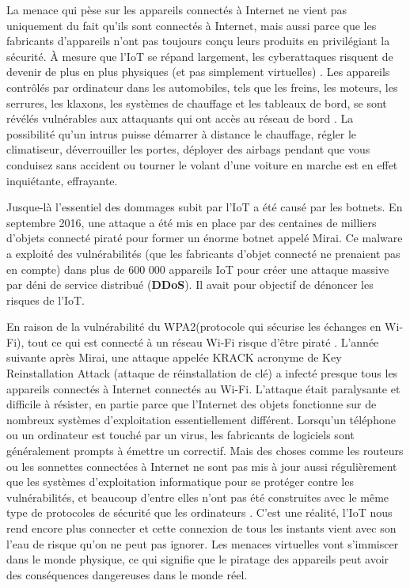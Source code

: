 La menace qui pèse sur les appareils connectés à Internet ne vient pas uniquement du fait qu’ils sont connectés à Internet, mais aussi parce que les fabricants d’appareils n’ont pas toujours conçu leurs produits en privilégiant la sécurité. À mesure que l'IoT se répand largement, les cyberattaques risquent de devenir de plus en plus physiques (et pas simplement virtuelles) \cite{clearfield2013rethinkingsiot}. Les appareils contrôlés par ordinateur dans les automobiles, tels que les freins, les moteurs, les serrures, les klaxons, les systèmes de chauf{\kern0pt}fage et les tableaux de bord, se sont révélés vulnérables aux attaquants qui ont accès au réseau de bord \cite{andy2013hackers,boyle2010proof}. La possibilité qu'un intrus puisse démarrer à distance le chauf{\kern0pt}fage, régler le climatiseur, déverrouiller les portes, déployer des airbags pendant que vous conduisez sans accident ou tourner le volant d'une voiture en marche est en ef{\kern0pt}fet inquiétante, ef{\kern0pt}frayante.


Jusque-là l’essentiel des dommages subit par l’IoT a été causé par les botnets. En septembre 2016, une attaque a été mis en place par des centaines de milliers d’objets connecté piraté pour former un énorme botnet appelé Mirai. Ce malware a exploité des vulnérabilités (que les fabricants d’objet connecté ne prenaient pas en compte) dans plus de 600 000 appareils IoT pour créer une attaque massive par déni de service distribué (\textbf{DDoS}). Il avait pour objectif de dénoncer les risques de l’IoT.


En raison de la vulnérabilité du WPA2(protocole qui sécurise les échanges en Wi-Fi), tout ce qui est connecté à un réseau Wi-Fi risque d’être piraté \cite{kasperski201krack}. L'année suivante après Mirai, une attaque appelée KRACK acronyme de Key Reinstallation Attack (attaque de réinstallation de clé) a infecté presque tous les appareils connectés à Internet connectés au Wi-Fi. L'attaque était paralysante et dif{\kern0pt}f{\kern0pt}icile à résister, en partie parce que l'Internet des objets fonctionne sur de nombreux systèmes d'exploitation essentiellement dif{\kern0pt}férent. Lorsqu'un téléphone ou un ordinateur est touché par un virus, les fabricants de logiciels sont généralement prompts à émettre un correctif. Mais des choses comme les routeurs ou les sonnettes connectées à Internet ne sont pas mis à jour aussi régulièrement que les systèmes d’exploitation informatique pour se protéger contre les vulnérabilités, et beaucoup d'entre elles n'ont pas été construites avec le même type de protocoles de sécurité que les ordinateurs \cite{pardes2020iot}. C’est une réalité, l’IoT nous rend encore plus connecter et cette connexion de tous les instants vient avec son l’eau de risque qu’on ne peut pas ignorer. Les menaces virtuelles vont s’immiscer dans le monde physique, ce qui signif{\kern0pt}ie que le piratage des appareils peut avoir des conséquences dangereuses dans le monde réel.


